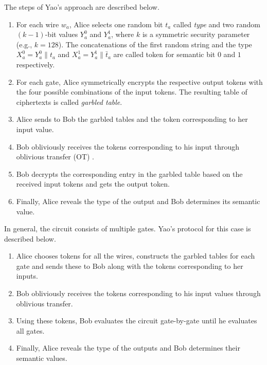 The steps of Yao's approach are described below.

\begin{enumerate}
\item
	For each wire $w_a$, Alice selects one random bit $t_a$ called \emph{type} and two random $(k-1)$-bit values $Y_a^{0}$ and $Y_a^{1}$, where $k$ is a symmetric security parameter (e.g., $k=128$).
	The concatenations of the first random string and the type $X_a^{0} =  Y_a^{0}\parallel t_a$ and $X_a^{1} =  Y_a^{1}\parallel \bar{t}_a$ are called token for semantic bit $0$ and $1$ respectively.

\item
	For each gate, Alice symmetrically encrypts the respective output tokens with the four possible combinations of the input tokens.
	The resulting table of ciphertexts is called \emph{garbled table}.

\item
	Alice sends to Bob the garbled tables and the token corresponding to her input value.

\item
	Bob obliviously receives the tokens corresponding to his input through oblivious transfer (OT) \cite{rabin2005exchange}.

\item
	Bob decrypts the corresponding entry in the garbled table based on the received input tokens and gets the output token.

\item
	Finally, Alice reveals the type of the output and Bob determines its semantic value.
\end{enumerate}

In general, the circuit consists of multiple gates.
Yao's protocol for this case is described below.

\begin{enumerate}
\item
	Alice chooses tokens for all the wires, constructs the garbled tables for each gate and sends these to Bob along with the tokens corresponding to her inputs.
\item
	Bob obliviously receives the tokens corresponding to his input values through oblivious transfer.
\item
	Using these tokens, Bob evaluates the circuit gate-by-gate until he evaluates all gates.
\item
	Finally, Alice reveals the type of the outputs and Bob determines their semantic values.
\end{enumerate}

